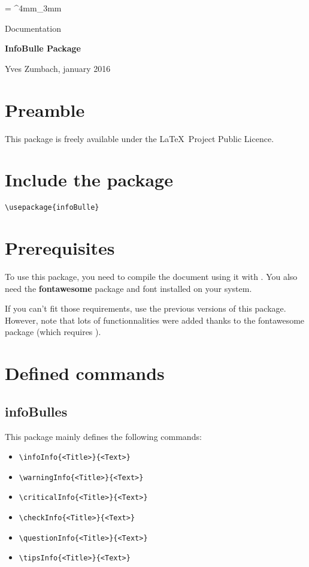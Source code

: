 \documentclass[a4paper, 11pt, oneside, fleqn]{article}
\newcommand{\inColor}[1]{{\bfseries\color{mainColor}#1}}
\newcommand{\myTitle}{\inColor{\fontsize{1.3cm}{1em}\selectfont InfoBulle Package}}
\begin{document}
\everyrow{\tabucline[.4mm  white]{}}
\tabulinesep = ^4mm_3mm


\hfill
\begin{minipage}{\widthof{\myTitle}}
	{\fontsize{.6cm}{1em}\selectfont\color{mainColor}
		Documentation
	}
	\begin{spacing}{3}
		\myTitle
	\end{spacing}
	\vspace*{-10mm}
	\begin{flushright}
		Yves Zumbach, january 2016
	\end{flushright}
\end{minipage}

\newpage

\section{Preamble}
This package is freely available under the \LaTeX\ Project Public Licence.

\section{Include the package}
\verb|\usepackage{infoBulle}|

\section{Prerequisites}
To use this package, you need to compile the document using it with \inColor{\XeLaTeX}. You also need the \inColor{fontawesome} package and font installed on your system.

If you can't fit those requirements, use the previous versions of this package. However, note that lots of functionnalities were added thanks to the fontawesome package (which requires \XeLaTeX).


\section{Defined commands}
\subsection{infoBulles}
This package mainly defines the following commands:
\begin{itemize}
	\item \verb|\infoInfo{<Title>}{<Text>}|
	\item \verb|\warningInfo{<Title>}{<Text>}|
	\item \verb|\criticalInfo{<Title>}{<Text>}|
	\item \verb|\checkInfo{<Title>}{<Text>}|
	\item \verb|\questionInfo{<Title>}{<Text>}|
	\item \verb|\tipsInfo{<Title>}{<Text>}|
\end{itemize}
\end{document}
